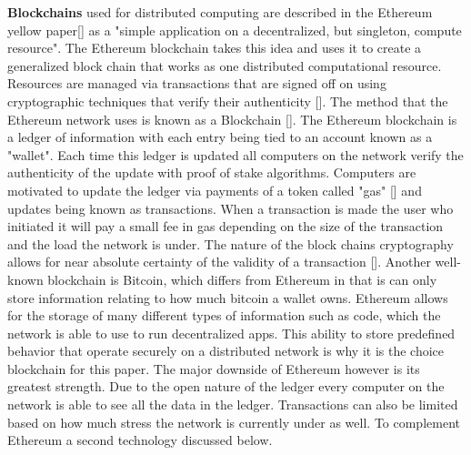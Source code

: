 \documentclass{article}
\begin{document}
\textbf{Blockchains} used for distributed computing are described in the Ethereum yellow paper[] as a "simple application on a decentralized, but singleton, compute resource". 
The Ethereum blockchain takes this idea and uses it to create a generalized block chain that works as one distributed computational resource. 
Resources are managed via transactions that are signed off on using cryptographic techniques that verify their authenticity []. 
The method that the Ethereum network uses is known as a Blockchain []. 
The Ethereum blockchain is a ledger of information with each entry being tied to an account known as a "wallet". 
Each time this ledger is updated all computers on the network verify the authenticity of the update with proof of stake algorithms. 
Computers are motivated to update the ledger via payments of a token called "gas" [] and updates being known as transactions. 
When a transaction is made the user who initiated it will pay a small fee in gas depending on the size of the transaction and the load the network is under. 
The nature of the block chains cryptography allows for near absolute certainty of the validity of a transaction []. 
Another well-known blockchain is Bitcoin, which differs from Ethereum in that is can only store information relating to how much bitcoin a wallet owns. 
Ethereum allows for the storage of many different types of information such as code, which the network is able to use to run decentralized apps. 
This ability to store predefined behavior that operate securely on a distributed network is why it is the choice blockchain for this paper. 
The major downside of Ethereum however is its greatest strength. 
Due to the open nature of the ledger every computer on the network is able to see all the data in the ledger. 
Transactions can also be limited based on how much stress the network is currently under as well. 
To complement Ethereum a second technology discussed below.
\end{document}
